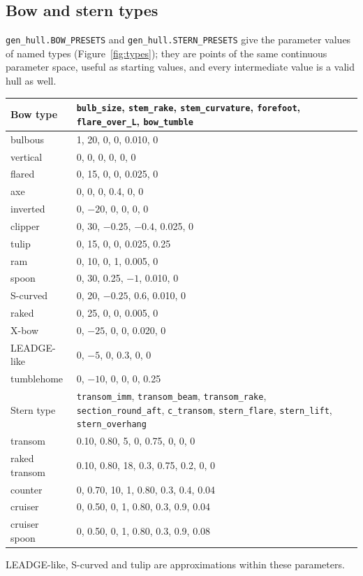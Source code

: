 \documentclass[11pt,a4paper]{article}
\newcommand{\cmd}[1]{\texttt{#1}}
\begin{document}
\subsection{Bow and stern types}
\label{sec:presets}
\cmd{gen\_hull.BOW\_PRESETS} and \cmd{gen\_hull.STERN\_PRESETS} give the parameter values of named
types (Figure~\ref{fig:types}); they are points of the same continuous parameter space, useful as
starting values, and every intermediate value is a valid hull as well.
\begin{longtable}{L{2.6cm}L{12.6cm}}
\toprule
Bow type & \cmd{bulb\_size}, \cmd{stem\_rake}, \cmd{stem\_curvature}, \cmd{forefoot}, \cmd{flare\_over\_L}, \cmd{bow\_tumble} \\ \midrule
bulbous & 1, 20, 0, 0, 0.010, 0 \\
vertical & 0, 0, 0, 0, 0, 0 \\
flared & 0, 15, 0, 0, 0.025, 0 \\
axe & 0, 0, 0, 0.4, 0, 0 \\
inverted & 0, $-20$, 0, 0, 0, 0 \\
clipper & 0, 30, $-0.25$, $-0.4$, 0.025, 0 \\
tulip & 0, 15, 0, 0, 0.025, 0.25 \\
ram & 0, 10, 0, 1, 0.005, 0 \\
spoon & 0, 30, 0.25, $-1$, 0.010, 0 \\
S-curved & 0, 20, $-0.25$, 0.6, 0.010, 0 \\
raked & 0, 25, 0, 0, 0.005, 0 \\
X-bow & 0, $-25$, 0, 0, 0.020, 0 \\
LEADGE-like & 0, $-5$, 0, 0.3, 0, 0 \\
tumblehome & 0, $-10$, 0, 0, 0, 0.25 \\
\midrule
Stern type & \cmd{transom\_imm}, \cmd{transom\_beam}, \cmd{transom\_rake}, \cmd{section\_round\_aft}, \cmd{c\_transom}, \cmd{stern\_flare}, \cmd{stern\_lift}, \cmd{stern\_overhang} \\ \midrule
transom & 0.10, 0.80, 5, 0, 0.75, 0, 0, 0 \\
raked transom & 0.10, 0.80, 18, 0.3, 0.75, 0.2, 0, 0 \\
counter & 0, 0.70, 10, 1, 0.80, 0.3, 0.4, 0.04 \\
cruiser & 0, 0.50, 0, 1, 0.80, 0.3, 0.9, 0.04 \\
cruiser spoon & 0, 0.50, 0, 1, 0.80, 0.3, 0.9, 0.08 \\
\bottomrule
\end{longtable}
LEADGE-like, S-curved and tulip are approximations within these parameters.
\end{document}
